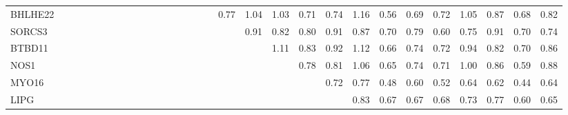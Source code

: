 \begin{longtable}{lrrrrrrrrrrrrrrrrrrrrrrrrrrrrr}
BHLHE22 &             &              &             &              &               &            &              &             &           &             &              &              &              &              &             &               &         0.77 &         1.04 &       1.03 &        0.71 &       0.74 &          1.16 &      0.56 &        0.69 &        0.72 &        1.05 &       0.87 &         0.68 &       0.82 \\
SORCS3  &             &              &             &              &               &            &              &             &           &             &              &              &              &              &             &               &              &         0.91 &       0.82 &        0.80 &       0.91 &          0.87 &      0.70 &        0.79 &        0.60 &        0.75 &       0.91 &         0.70 &       0.74 \\
BTBD11  &             &              &             &              &               &            &              &             &           &             &              &              &              &              &             &               &              &              &       1.11 &        0.83 &       0.92 &          1.12 &      0.66 &        0.74 &        0.72 &        0.94 &       0.82 &         0.70 &       0.86 \\
NOS1    &             &              &             &              &               &            &              &             &           &             &              &              &              &              &             &               &              &              &            &        0.78 &       0.81 &          1.06 &      0.65 &        0.74 &        0.71 &        1.00 &       0.86 &         0.59 &       0.88 \\
MYO16   &             &              &             &              &               &            &              &             &           &             &              &              &              &              &             &               &              &              &            &             &       0.72 &          0.77 &      0.48 &        0.60 &        0.52 &        0.64 &       0.62 &         0.44 &       0.64 \\
LIPG    &             &              &             &              &               &            &              &             &           &             &              &              &              &              &             &               &              &              &            &             &            &          0.83 &      0.67 &        0.67 &        0.68 &        0.73 &       0.77 &         0.60 &       0.65 \\

\end{longtable}
